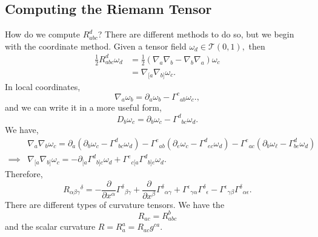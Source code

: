 \documentclass{article}
\numberwithin{equation}{section}
\begin{document}
\subsection{Computing the Riemann Tensor}
How do we compute $R_{abc}^d$? There are different methods to do so, but we begin with the coordinate method. Given a tensor field $\omega_d \in \mathcal{T}(0,1),$ then 
\begin{align*}
    \frac{1}{2}R_{abc}^d \omega_d &= \frac{1}{2}(\nabla_a\nabla_b - \nabla_b\nabla_a)\omega_c \\ 
    &= \nabla_{[a}\nabla_{b]}\omega_c.
\end{align*}
In local coordinates,
\begin{equation*}
    \nabla_a\omega_b = \partial_a\omega_b - \Gamma^c{}_{ab}\omega_c.,
\end{equation*}
and we can write it in a more useful form,
\begin{equation*}
    D_b\omega_c = \partial_b\omega_c - \Gamma^d{}_{bc}\omega_d.
\end{equation*}
We have,
\begin{align*}
    & \nabla_a\nabla_b \omega_c = \partial_a(\partial_b\omega_c - \Gamma^d{}_{bc}\omega_d) - \Gamma^e{}_{ab}\left(\partial_e\omega_c - \Gamma^d{}_{ec}\omega_d\right) - \Gamma^e{}_{ac}\left(\partial_b\omega_\ell - \Gamma^d_{be}\omega_d\right)\\
    \implies & \nabla_{[a}\nabla_{b]}\omega_c = -\partial_{[a}\Gamma^d{}_{b]c}\omega_d + \Gamma^e{}_{c[a}\Gamma^d{}_{b]e}\omega_d.
\end{align*}
Therefore,
\begin{equation*}
    R_{\alpha\beta\gamma}{}^{\delta} = -\frac{\partial}{\partial x^\alpha} \Gamma^{\delta}{}_{\beta\gamma} + \frac{\partial}{\partial x^\beta}\Gamma^{\delta}{}_{\alpha\gamma} + \Gamma^{\epsilon}{}_{\gamma\alpha}\Gamma^{\delta}{}_{\epsilon} - \Gamma^{\epsilon}{}_{\gamma\beta}\Gamma^{\delta}{}_{\alpha\epsilon}.
\end{equation*}
There are different types of curvature tensors. We have the 
\begin{equation*}
    R_{ac} = R_{abc}^b
\end{equation*}
and the scalar curvature $R=R_a^a = R_{ac}g^{ca}.$
\end{document}
